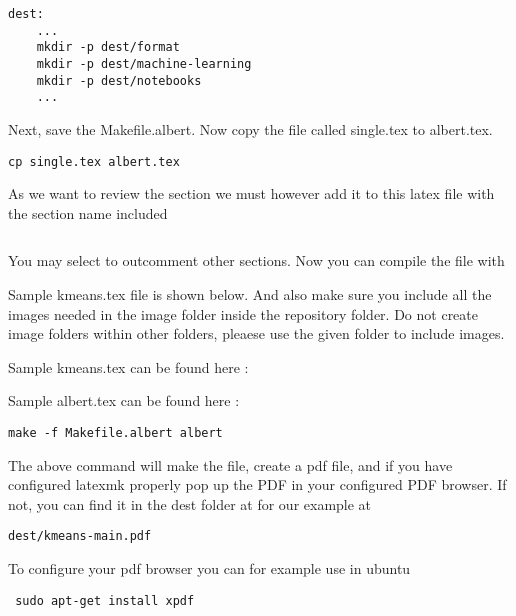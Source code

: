 \begin{lstlisting}
dest:
    ...
    mkdir -p dest/format
    mkdir -p dest/machine-learning
    mkdir -p dest/notebooks
    ...
\end{lstlisting}

Next, save the Makefile.albert.
Now copy the file called single.tex to albert.tex. 

\begin{lstlisting}
cp single.tex albert.tex
\end{lstlisting}

As we want to review the section we must however  add it to this latex
file with the section name included

\begin{lstlisting}

\end{lstlisting}

You may select to outcomment other sections.
Now you can compile the file with 

Sample kmeans.tex file is shown below. And also make sure you include
all the images needed in the image folder inside the repository folder.
Do not create image folders within other folders, pleaese use the given
folder to include images. 

Sample kmeans.tex can be found here :



Sample albert.tex can be found here :

\begin{lstlisting}
make -f Makefile.albert albert
\end{lstlisting}


The above command will make the file, create a pdf file, and if you
have configured latexmk properly pop up the PDF in your configured PDF
browser. If not, you can find it in the dest folder at for our example
at 

\begin{lstlisting}
dest/kmeans-main.pdf
\end{lstlisting}


To configure your pdf browser you can for example use in ubuntu

\begin{lstlisting}
 sudo apt-get install xpdf
\end{lstlisting}


